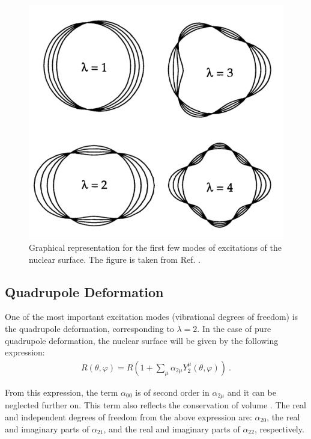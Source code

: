 \begin{figure}
    \centering
    \includegraphics[scale=0.3]{Chapters/Figures/nuclearDeformation.png}
    \caption{Graphical representation for the first few modes of excitations of the nuclear surface. The figure is taken from Ref. \cite{greiner1996nuclear}.}
    \label{multipole-deformations}
\end{figure}

\subsection{Quadrupole Deformation}

One of the most important excitation modes (vibrational degrees of freedom) is the quadrupole deformation, corresponding to $\lambda=2$. In the case of pure quadrupole deformation, the nuclear surface will be given by the following expression:
\begin{align}
    R(\theta,\varphi)=R\left(1+\sum_\mu\alpha_{2\mu}Y_2^\mu(\theta,\varphi)\right)\ . \label{quadrupole-surface}
\end{align}

From this expression, the term $\alpha_{00}$ is of second order in $\alpha_{2\mu}$ and it can be neglected further on. This term also reflects the conservation of volume \cite{greiner1996nuclear,ring2004nuclear}. The real and independent degrees of freedom from the above expression are: $\alpha_{20}$, the real and imaginary parts of $\alpha_{21}$, and the real and imaginary parts of $\alpha_{22}$, respectively.

